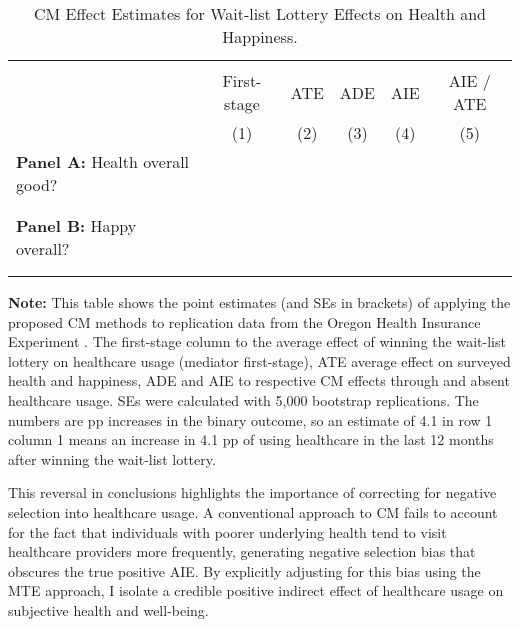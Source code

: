 \begin{table}[h!]
    \singlespacing
    \centering
    \small
    \caption{CM Effect Estimates for Wait-list Lottery Effects on Health and Happiness.}
    \begin{tabular}{l c c c c c}
        \\[-1.8ex]\hline \hline \\[-1.8ex] 
        & First-stage & ATE & ADE & AIE & AIE / ATE \\
        \cmidrule(lr){2-6}
        & (1) & (2) & (3) & (4) & (5) \\
        \midrule
        \multicolumn{1}{l}{\textbf{Panel A:} Health overall good?} \\
        
        \\[-1.8ex]\hline \\[-1.8ex]
        \multicolumn{1}{l}{\textbf{Panel B:} Happy overall?} \\
        
        \\[-1.8ex]\hline \\[-1.8ex]
    \end{tabular}
    \vspace{-0.125cm}
    \label{tab:cm-oregon}
    \justify
    \footnotesize
    \textbf{Note:}
    This table shows the point estimates (and SEs in brackets) of applying the proposed CM methods to replication data from the Oregon Health Insurance Experiment \citep{icspr2014oregon}.
    The first-stage column to the average effect of winning the wait-list lottery on healthcare usage (mediator first-stage), ATE average effect on surveyed health and happiness, ADE and AIE to respective CM effects through and absent healthcare usage.
    SEs were calculated with 5,000 bootstrap replications.
    The numbers are pp increases in the binary outcome, so an estimate of 4.1 in row 1 column 1 means an increase in 4.1 pp of using healthcare in the last 12 months after winning the wait-list lottery.
\end{table}

This reversal in conclusions highlights the importance of correcting for negative selection into healthcare usage.
A conventional approach to CM fails to account for the fact that individuals with poorer underlying health tend to visit healthcare providers more frequently, generating negative selection bias that obscures the true positive AIE.
By explicitly adjusting for this bias using the MTE approach, I isolate a credible positive indirect effect of healthcare usage on subjective health and well-being.

